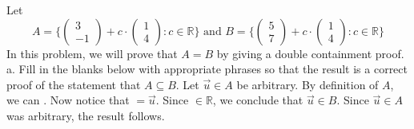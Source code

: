 \documentclass[12pt]{article}
\newenvironment{problem}[2][Problem]
{
	\begin{trivlist} 
		\item[\hskip \labelsep {\bfseries #1 #2:}]
	}
{
	\end{trivlist}
	}
\begin{document}
\newpage
\begin{problem}{4}
Let 
\[
A= \Bigg\{ \begin{pmatrix} 3 \\ -1 \end{pmatrix} + c \cdot \begin{pmatrix} 1 \\ 4 \end{pmatrix} : c \in \mathbb{R} \Bigg\} \text{ and } B= \Bigg\{ \begin{pmatrix} 5 \\ 7 \end{pmatrix} + c \cdot \begin{pmatrix} 1 \\ 4 \end{pmatrix} : c \in \mathbb{R} \Bigg\}
\]
In this problem, we will prove that $A=B$ by giving a double containment proof.
\newline
\newline
\noindent
a. Fill in the blanks below with appropriate phrases so that the result is a correct proof of the statement that $A \subseteq B$. 
\newline
\newline
Let $\vec{u} \in A$ be arbitrary. By definition of $A$, we can \underline{\hspace{2cm}}. Now notice that
\underline{\hspace{2cm}}$=\vec{u}$. Since \underline{\hspace{2cm}}$\in \mathbb{R}$, we conclude that $\vec{u} \in B$. Since $\vec{u} \in A$ was arbitrary, the result follows.


\end{problem}
\end{document}
